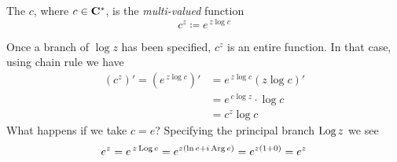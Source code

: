 \vspace*{1em}

\begin{definition}
The  {\color{blue}$c$}, where $c\in \mathbf C^*$, is the \emph{multi-valued} function
\[c^z \coloneqq e^{\,z\log c}\]
\end{definition}

\vspace*{1em}

\begin{discussion}
Once a branch of $\log z$ has been specified, $c^z$ is an entire function. In that case, using chain rule we have
\begin{align*}
(c^z)' = (e^{\,z\log c})' &= e^{\,z\log c}(z\log c)'\\[0.5em]
&= e^{\,c\log z}\cdot \log c\\[0.5em]
&= c^z\log c
\end{align*}
What happens if we take $c = e$? Specifying the principal branch $\operatorname{Log} z$ we see
\[e^z = e^{\,z\operatorname{Log} e} = e^{z(\ln e + i\operatorname{Arg} e)} = e^{z(1 + 0)} = e^z\]
\end{discussion}

\vspace*{1em}

